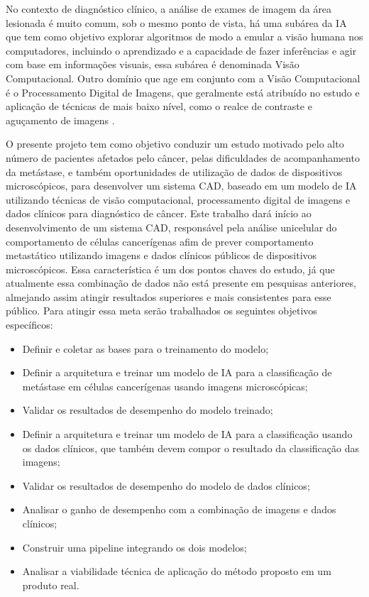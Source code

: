 No contexto de diagnóstico clínico, a análise de exames de imagem da área lesionada é muito comum, sob o mesmo ponto de vista, há uma subárea da IA que tem como objetivo explorar algoritmos de modo a emular a visão humana nos computadores, incluindo o aprendizado e a capacidade de fazer inferências e agir com base em informações visuais, essa subárea é denominada Visão Computacional. Outro domínio que age em conjunto com a Visão Computacional é o Processamento Digital de Imagens, que geralmente está atribuído no estudo e aplicação de técnicas de mais baixo nível, como o realce de contraste e aguçamento de imagens \cite{gonzalez2008digital}.

O presente projeto tem como objetivo conduzir um estudo motivado pelo alto número de pacientes afetados pelo câncer, pelas dificuldades de acompanhamento da metástase, e também oportunidades de utilização de dados de dispositivos microscópicos, para desenvolver um sistema CAD, baseado em um modelo de IA utilizando técnicas de visão computacional, processamento digital de imagens e dados clínicos para diagnóstico de câncer. Este trabalho dará início ao desenvolvimento de um sistema CAD, responsável pela análise unicelular do comportamento de células cancerígenas afim de prever comportamento metastático utilizando imagens e dados clínicos públicos de dispositivos microscópicos. Essa característica é um dos pontos chaves do estudo, já que atualmente essa combinação de dados não está presente em pesquisas anteriores, almejando assim atingir resultados superiores e mais consistentes para esse público. Para atingir essa meta serão trabalhados os seguintes objetivos específicos:

\begin{itemize}
        \item Definir e coletar as bases para o treinamento do modelo;
        \item Definir a arquitetura e treinar um modelo de IA para a classificação de metástase em células cancerígenas usando imagens microscópicas;
        \item Validar os resultados de desempenho do modelo treinado;
        \item Definir a arquitetura e treinar um modelo de IA para a classificação usando os dados clínicos, que também devem compor o resultado da classificação das imagens;
        \item Validar os resultados de desempenho do modelo de dados clínicos;
        \item Analisar o ganho de desempenho com a combinação de imagens e dados clínicos;
        \item Construir uma pipeline integrando os dois modelos;
        \item Analisar a viabilidade técnica de aplicação do método proposto em um produto real.
\end{itemize}

